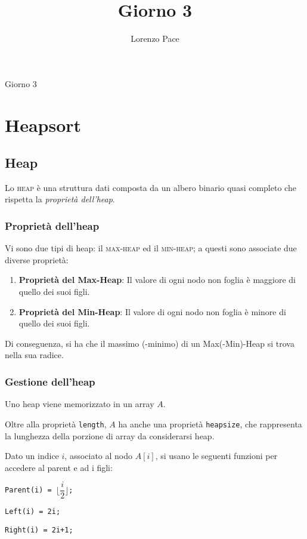 \documentclass[a4paper,10pt]{article}
\title{Giorno 3}
\author{Lorenzo Pace}
\theoremstyle{definition}
\begin{document}
\begin{center}
    \LARGE Giorno 3
\end{center}
\section{Heapsort}
\subsection{Heap}
Lo \textsc{heap} è una struttura dati composta da un albero binario quasi completo che rispetta la \emph{proprietà dell'heap}.
\subsubsection{Proprietà dell'heap}
Vi sono due tipi di heap: il \textsc{max-heap} ed il \textsc{min-heap}; a questi sono associate due diverse proprietà:
\begin{enumerate}
    \item \textbf{Proprietà del Max-Heap}: Il valore di ogni nodo non foglia è maggiore di quello dei suoi figli.
        
    \item \textbf{Proprietà del Min-Heap}: Il valore di ogni nodo non foglia è minore di quello dei suoi figli. 
\end{enumerate}
Di conseguenza, si ha che il massimo (-minimo) di un Max(-Min)-Heap si trova nella sua radice.
\subsubsection{Gestione dell'heap}
Uno heap viene memorizzato in un array $A$.\smallskip

Oltre alla proprietà \texttt{length}, $A$ ha anche una proprietà \texttt{heapsize}, che rappresenta la lunghezza della porzione di array da considerarsi heap.\smallskip 

Dato un indice $i$, associato al nodo $A[i]$, si usano le seguenti funzioni per accedere al parent e ad i figli:
\begin{multicols}{3}\begin{center}
\texttt{Parent(i) = $\bigg\lfloor \dfrac{i}{2} \bigg\rfloor$;}
\end{center}
\begin{center}
\texttt{Left(i) = 2i;}
\end{center}
\begin{center}
\texttt{Right(i) = 2i+1;}
\end{center}
\end{multicols}
\end{document}
